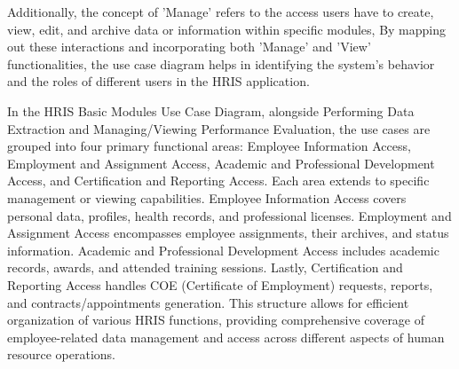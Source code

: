    Additionally, the concept of 'Manage' refers to the access users have to create, view, edit, and archive data or information within specific modules, By mapping out these interactions and incorporating both 'Manage' and 'View' functionalities, the use case diagram helps in identifying the system's behavior and the roles of different users in the HRIS application.

    In the HRIS Basic Modules Use Case Diagram, alongside Performing Data Extraction and Managing/Viewing Performance Evaluation, the use cases are grouped into four primary functional areas: Employee Information Access, Employment and Assignment Access, Academic and Professional Development Access, and Certification and Reporting Access. Each area extends to specific management or viewing capabilities. Employee Information Access covers personal data, profiles, health records, and professional licenses. Employment and Assignment Access encompasses employee assignments, their archives, and status information. Academic and Professional Development Access includes academic records, awards, and attended training sessions. Lastly, Certification and Reporting Access handles COE (Certificate of Employment) requests, reports, and contracts/appointments generation. This structure allows for efficient organization of various HRIS functions, providing comprehensive coverage of employee-related data management and access across different aspects of human resource operations.

